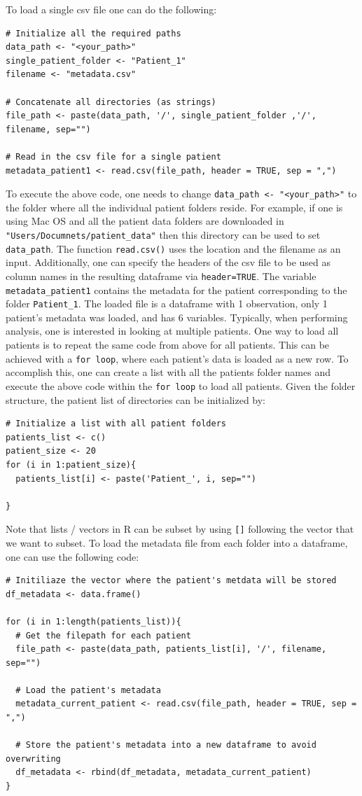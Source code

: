 To load a single csv file one can do the following:
\begin{lstlisting}
# Initialize all the required paths
data_path <- "<your_path>"
single_patient_folder <- "Patient_1"
filename <- "metadata.csv"

# Concatenate all directories (as strings)
file_path <- paste(data_path, '/', single_patient_folder ,'/', filename, sep="")

# Read in the csv file for a single patient
metadata_patient1 <- read.csv(file_path, header = TRUE, sep = ",")
\end{lstlisting}
To execute the above code, one needs to change \verb|data_path <- "<your_path>"| to the folder where all the individual patient folders reside. For example, if one is using Mac OS and all the patient data folders are downloaded in \verb|"Users/Documnets/patient_data"| then this directory can be used to set \verb|data_path|.
The function \verb|read.csv()| uses the location and the filename as an input. Additionally, one can specify the headers of the csv file to be used as column names in the resulting dataframe via \verb|header=TRUE|. The variable \verb|metadata_patient1| contains the metadata for the patient corresponding to the folder \verb|Patient_1|. The loaded file is a dataframe with 1 observation, only 1 patient's metadata was loaded, and has 6 variables. Typically, when performing analysis, one is interested in looking at multiple patients. One way to load all patients is to repeat the same code from above for all patients. This can be achieved with a \verb|for loop|, where each patient's data is loaded as a new row. To accomplish this, one can create a list with all the patients folder names and execute the above code within the \verb|for loop| to load all patients. Given the folder structure, the patient list of directories can be initialized by:
\begin{lstlisting}
# Initialize a list with all patient folders
patients_list <- c()
patient_size <- 20
for (i in 1:patient_size){
  patients_list[i] <- paste('Patient_', i, sep="")

}
\end{lstlisting}
Note that lists / vectors in R can be subset by using \verb|[]| following the vector that we want to subset.
To load the metadata file from each folder into a dataframe, one can use the following code:
\begin{lstlisting}
# Initiliaze the vector where the patient's metdata will be stored
df_metadata <- data.frame()

for (i in 1:length(patients_list)){
  # Get the filepath for each patient
  file_path <- paste(data_path, patients_list[i], '/', filename, sep="")

  # Load the patient's metadata
  metadata_current_patient <- read.csv(file_path, header = TRUE, sep = ",")

  # Store the patient's metadata into a new dataframe to avoid overwriting
  df_metadata <- rbind(df_metadata, metadata_current_patient)
}
\end{lstlisting}
